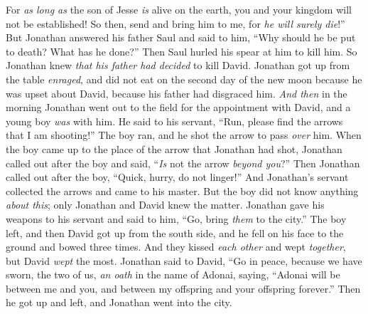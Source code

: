 \begin{biblechapter}
\verse For \textit{as long as} the son of Jesse \textit{is} alive on the earth, you and your kingdom will not be established! So then, send and bring him to me, for \textit{he will surely die}!”
\verse But Jonathan answered his father Saul and said to him, “Why should he be put to death? What has he done?”
\verse Then Saul hurled his spear at him to kill him. So Jonathan knew \textit{that his father had decided} to kill David.
\verse Jonathan got up from the table \textit{enraged}, and did not eat on the second day of the new moon because he was upset about David, because his father had disgraced him.
\verse \textit{And then} in the morning Jonathan went out to the field for the appointment with David, and a young boy \textit{was} with him.
\verse He said to his servant, “Run, please find the arrows that I am shooting!” The boy ran, and he shot the arrow to pass \textit{over} him.
\verse When the boy came up to the place of the arrow that Jonathan had shot, Jonathan called out after the boy and said, “\textit{Is} not the arrow \textit{beyond you}?”
\verse Then Jonathan called out after the boy, “Quick, hurry, do not linger!” And Jonathan’s servant collected the arrows and came to his master.
\verse But the boy did not know anything \textit{about this}; only Jonathan and David knew the matter.
\verse Jonathan gave his weapons to his servant and said to him, “Go, bring \textit{them} to the city.”
\verse The boy left, and then David got up from the south side, and he fell on his face to the ground and bowed three times. And they kissed \textit{each other} and wept \textit{together}, but David \textit{wept} the most.
\verse Jonathan said to David, “Go in peace, because we have sworn, the two of us, \textit{an oath} in the name of Adonai, saying, “Adonai will be between me and you, and between my offspring and your offspring forever.” Then he got up and left, and Jonathan went into the city.
\end{biblechapter}

